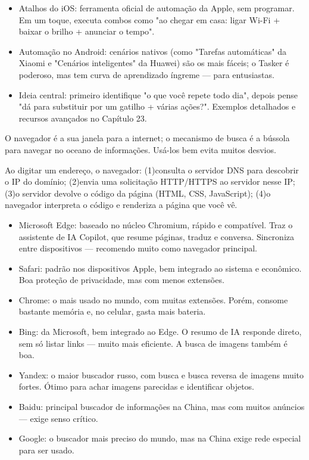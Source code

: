 \begin{itemize}
  \item Atalhos do iOS: ferramenta oficial de automação da Apple, sem programar. Em um toque, executa combos como "ao chegar em casa: ligar Wi-Fi + baixar o brilho + anunciar o tempo".
  \item Automação no Android: cenários nativos (como "Tarefas automáticas" da Xiaomi e "Cenários inteligentes" da Huawei) são os mais fáceis; o Tasker é poderoso, mas tem curva de aprendizado íngreme — para entusiastas.
  \item Ideia central: primeiro identifique "o que você repete todo dia", depois pense "dá para substituir por um gatilho + várias ações?". Exemplos detalhados e recursos avançados no Capítulo 23.
\end{itemize}


O navegador é a sua janela para a internet; o mecanismo de busca é a bússola para navegar no oceano de informações. Usá-los bem evita muitos desvios.


Ao digitar um endereço, o navegador: (1)consulta o servidor DNS para descobrir o IP do domínio; (2)envia uma solicitação HTTP/HTTPS ao servidor nesse IP; (3)o servidor devolve o código da página (HTML, CSS, JavaScript); (4)o navegador interpreta o código e renderiza a página que você vê.


\begin{itemize}
  \item Microsoft Edge: baseado no núcleo Chromium, rápido e compatível. Traz o assistente de IA Copilot, que resume páginas, traduz e conversa. Sincroniza entre dispositivos — recomendo muito como navegador principal.
  \item Safari: padrão nos dispositivos Apple, bem integrado ao sistema e econômico. Boa proteção de privacidade, mas com menos extensões.
  \item Chrome: o mais usado no mundo, com muitas extensões. Porém, consome bastante memória e, no celular, gasta mais bateria.
\end{itemize}


\begin{itemize}
  \item Bing: da Microsoft, bem integrado ao Edge. O resumo de IA responde direto, sem só listar links — muito mais eficiente. A busca de imagens também é boa.
  \item Yandex: o maior buscador russo, com busca e busca reversa de imagens muito fortes. Ótimo para achar imagens parecidas e identificar objetos.
  \item Baidu: principal buscador de informações na China, mas com muitos anúncios — exige senso crítico.
  \item Google: o buscador mais preciso do mundo, mas na China exige rede especial para ser usado.
\end{itemize}

